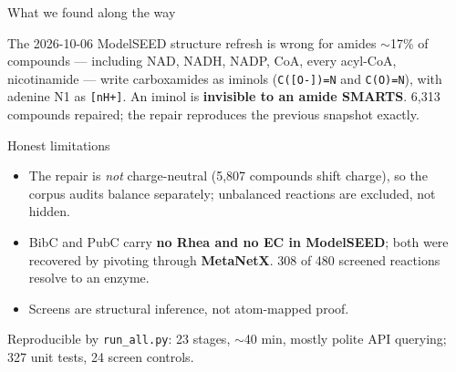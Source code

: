 \documentclass[aspectratio=169,10pt]{beamer}
\newcommand{\bad}[1]{{\color{cBad}#1}}
\newcommand{\takeaway}[1]{\vfill\begin{tcolorbox}[colback=structure!12!white,
  colframe=structure!60!black,boxrule=0.4pt,left=5pt,right=5pt,top=3pt,bottom=3pt]
  \small #1\end{tcolorbox}}
\begin{document}
\begin{frame}{What we found along the way}
  \begin{block}{The 2026-10-06 ModelSEED structure refresh is wrong for amides}
    $\sim$17\% of compounds --- including NAD, NADH, NADP, CoA, every acyl-CoA,
    nicotinamide --- write carboxamides as \bad{iminols} (\texttt{C([O-])=N} and
    \texttt{C(O)=N}), with adenine N1 as \texttt{[nH+]}. An iminol is
    \textbf{invisible to an amide SMARTS}. 6{,}313 compounds repaired; the repair
    reproduces the previous snapshot exactly.
  \end{block}

  \begin{block}{Honest limitations}
    \begin{itemize}
      \item The repair is \emph{not} charge-neutral (5{,}807 compounds shift
        charge), so the corpus audits balance separately; unbalanced reactions
        are excluded, not hidden.
      \item BibC and PubC carry \textbf{no Rhea and no EC in ModelSEED}; both
        were recovered by pivoting through \textbf{MetaNetX}. 308 of 480
        screened reactions resolve to an enzyme.
      \item Screens are structural inference, not atom-mapped proof.
    \end{itemize}
  \end{block}

  \takeaway{Reproducible by \texttt{run\_all.py}: 23 stages, $\sim$40 min,
  mostly polite API querying; 327 unit tests, 24 screen controls.}
\end{frame}
\end{document}
